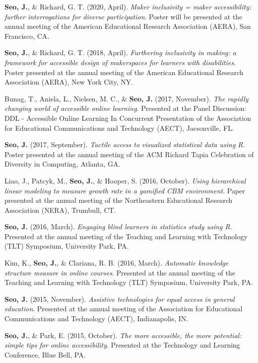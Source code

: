 \documentclass[11pt, a4paper]{awesome-cv}
\begin{document}
\begingroup
\setlength{\parindent}{-0.5in}
\setlength{\leftskip}{0.5in}

\textbf{Seo, J.}, \& Richard, G. T. (2020, April). \emph{Maker inclusivity = maker accessibility: further interrogations for diverse participation}. Poster will be presented at the annual meeting of the American Educational Research Association (AERA), San Francisco, CA.

\textbf{Seo, J.}, \& Richard, G. T. (2018, April). \emph{Furthering inclusivity in making: a framework for accessible design of makerspaces for learners with disabilities}. Poster presented at the annual meeting of the American Educational Research Association (AERA), New York City, NY.

Bunag, T., Aniela, L., Nielsen, M. C., \& \textbf{Seo, J.} (2017, November). \emph{The rapidly changing world of accessible online learning}. Presented at the Panel Discussion: DDL - Accessible Online Learning In Concurrent Presentation of the Association for Educational Communications and Technology (AECT), Jacsonville, FL.

\textbf{Seo, J.} (2017, September). \emph{Tactile access to visualized statistical data using R}. Poster presented at the annual meeting of the ACM Richard Tapia Celebration of Diversity in Computing, Atlanta, GA.

Liao, J., Patcyk, M., \textbf{Seo, J.}, \& Hooper, S. (2016, October). \emph{Using hierarchical linear modeling to measure growth rate in a gamified CBM environment}. Paper presented at the annual meeting of the Northeastern Educational Research Association (NERA), Trumbull, CT.

\textbf{Seo, J.} (2016, March). \emph{Engaging blind learners in statistics study using R}. Presented at the annual meeting of the Teaching and Learning with Technology (TLT) Symposium, University Park, PA.

Kim, K., \textbf{Seo, J.}, \& Clariana, R. B. (2016, March). \emph{Automatic knowledge structure measure in online courses}. Presented at the annual meeting of the Teaching and Learning with Technology (TLT) Symposium, University Park, PA.

\textbf{Seo, J.} (2015, November). \emph{Assistive technologies for equal access in general education}. Presented at the annual meeting of the Association for Educational Communications and Technology (AECT), Indianapolis, IN.

\textbf{Seo, J.}, \& Park, E. (2015, October). \emph{The more accessible, the more potential: simple tips for online accessibility}. Presented at the Technology and Learning Conference, Blue Bell, PA.
\end{document}
